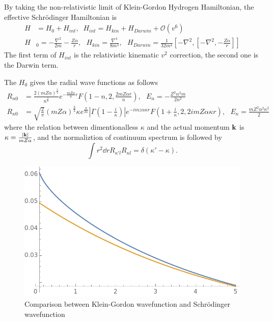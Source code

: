\documentclass[aps,prd,preprint,showkeys,10pt]{revtex4-1}
\newcommand{\vbk}{\vb{k}}
\renewcommand{\a}{\alpha}
\newcommand{\ka}{\kappa}
\begin{document}
By taking the non-relativistic limit of Klein-Gordon Hydrogen Hamiltonian, the effective Schr\"odinger Hamiltonian is\cite{Holstein2014}
\begin{align}
	H & =H_0+H_{int} ,\;\;H_{int}=H_{kin}+H_{Darwin}+\mathcal{O}(v^6)                                                                                            \\
	H & _0=-\frac{\nabla^2}{2m}-\frac{Z\alpha}{r},\ \ \ H_{kin}=\frac{\nabla^4}{8m^3},\ \ \ H_{Darwin}=\frac{1}{32m^4}[-\nabla^2,[-\nabla^2,-\frac{Z\alpha}{r}]]
\end{align}
The first term of $H_{int}$ is the relativistic kinematic $v^2$ correction, the second one is the Darwin term.

The $H_0$ gives the radial wave functions as follows
\begin{align}
	R_{n0}       & =\frac{2(mZ\alpha)^\frac{3}{2}}{n^\frac{3}{2}}e^{-\frac{mZ\alpha}{n}r}F(1-n,2,\frac{2mZ\alpha r}{n}),\ \ \ E_n=-\frac{Z^2\alpha^2m}{2n^2}                                                                             \\
	R_{\kappa 0} & =\sqrt{\frac{2}{\pi}}(mZ\alpha)^\frac{3}{2}\kappa e^\frac{\pi}{2\kappa}|\Gamma(1-\frac{i}{\kappa})|e^{-imz\alpha \kappa r}F(1+\frac{i}{\kappa},2,2imZ\alpha \kappa r),\ \ \ E_{\kappa}=\frac{mZ^2\alpha^2\kappa^2}{2}
\end{align}
where the relation between dimentionalless $\ka$ and the actual momentum $\vbk$ is $\kappa=\frac{\abs{\vbk}}{m Z \a}$, and the normaliztion of continuum spectrum is followed by $$\int r^2\dd rR_{\ka' l}R_{\ka l}=\delta(\ka'-\ka).$$
\begin{figure}
	\centering
	\includegraphics[width=4 in]{QM-KG-1.pdf}
	\caption{Comparison between Klein-Gordon wavefunction and Schr\"odinger wavefunction}
\end{figure}
\end{document}
